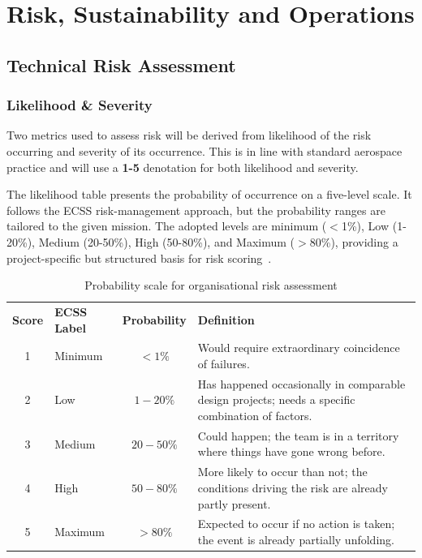 \chapter{Risk, Sustainability and Operations}
\section{Technical Risk Assessment}
\subsection{Likelihood \& Severity}
\label{sec: likelihood and severity}
Two metrics used to assess risk will be derived from likelihood of the risk occurring and severity of its occurrence. This is in line with standard aerospace practice and will use a \textbf{1-5} denotation for both likelihood and severity. \medskip


\noindent The likelihood table presents the probability of occurrence on a five-level scale. It follows the ECSS risk-management approach, but the probability ranges are tailored to the given mission. The adopted levels are minimum ($<$1\%), Low (1-20\%), Medium (20-50\%), High (50-80\%), and Maximum ($>$80\%), providing a project-specific but structured basis for risk scoring~\cite{ECSS_M_ST_80C_2008}.




\begin{table}[H]
\centering
\footnotesize
\renewcommand{\arraystretch}{1.3}
\setlength{\tabcolsep}{8pt}
\begin{tabular}{c l c p{8cm}}
\rowcolor{gray!20}
\textbf{Score} & \textbf{ECSS Label} & \textbf{Probability} & \textbf{Definition} \\

\rowcolor{green!20}
1 & Minimum & $<1\%$ & Would require extraordinary coincidence of failures. \\

\rowcolor{lime!30}
2 & Low & $1{-}20\%$ & Has happened occasionally in comparable design projects; needs a specific combination of factors. \\

\rowcolor{yellow!30}
3 & Medium & $20{-}50\%$ & Could happen; the team is in a territory where things have gone wrong before. \\

\rowcolor{orange!40}
4 & High & $50{-}80\%$ & More likely to occur than not; the conditions driving the risk are already partly present. \\

\rowcolor{red!40}
5 & Maximum & $>80\%$ & Expected to occur if no action is taken; the event is already partially unfolding. \\

\end{tabular}
\caption{Probability scale for organisational risk assessment}
\end{table}


